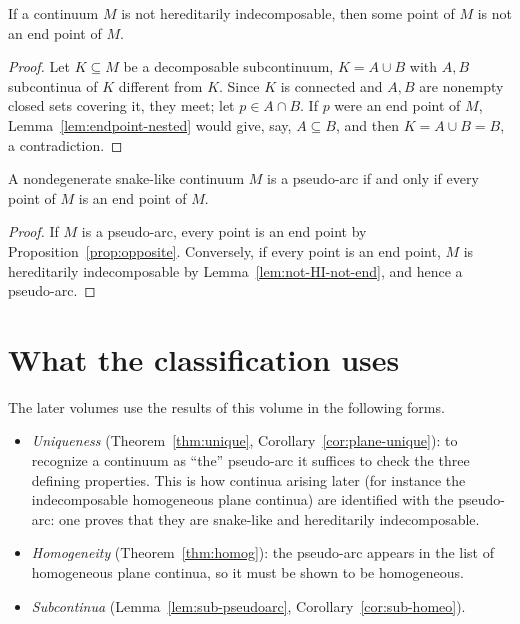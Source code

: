 
\begin{lemma}\label{lem:not-HI-not-end}
If a continuum $M$ is not hereditarily indecomposable, then some point of $M$ is not an end point
of $M$.
\end{lemma}

\begin{proof}
Let $K\subseteq M$ be a decomposable subcontinuum, $K=A\cup B$ with $A,B$ subcontinua of $K$
different from $K$. Since $K$ is connected and $A,B$ are nonempty closed sets covering it, they
meet; let $p\in A\cap B$. If $p$ were an end point of $M$, Lemma~\ref{lem:endpoint-nested} would
give, say, $A\subseteq B$, and then $K=A\cup B=B$, a contradiction.
\end{proof}


\begin{theorem}\label{thm:endpoints}
A nondegenerate snake-like continuum $M$ is a pseudo-arc if and only if every point of $M$ is an
end point of $M$.
\end{theorem}

\begin{proof}
If $M$ is a pseudo-arc, every point is an end point by Proposition~\ref{prop:opposite}.
Conversely, if every point is an end point, $M$ is hereditarily indecomposable by
Lemma~\ref{lem:not-HI-not-end}, and hence a pseudo-arc.
\end{proof}


\section{What the classification uses}\label{sec:main-uses}

The later volumes use the results of this volume in the following forms.
\begin{itemize}
\item \emph{Uniqueness} (Theorem~\ref{thm:unique}, Corollary~\ref{cor:plane-unique}): to recognize
a continuum as ``the'' pseudo-arc it suffices to check the three defining properties. This is how
continua arising later (for instance the indecomposable homogeneous plane continua) are
identified with the pseudo-arc: one proves that they are snake-like and hereditarily
indecomposable.
\item \emph{Homogeneity} (Theorem~\ref{thm:homog}): the pseudo-arc appears in the list of
homogeneous plane continua, so it must be shown to be homogeneous.
\item \emph{Subcontinua} (Lemma~\ref{lem:sub-pseudoarc}, Corollary~\ref{cor:sub-homeo}).
\end{itemize}

